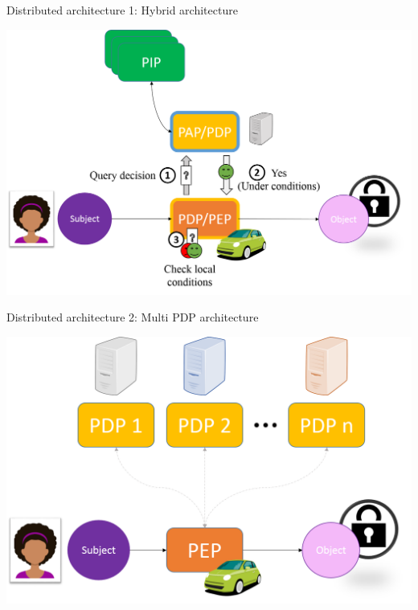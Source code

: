 \begin{frame}{Distributed architecture 1: Hybrid architecture}
    \begin{center}
        \includegraphics[scale=0.35]{Figures/hybrid_archi.png}
    \end{center}    
\end{frame}


\begin{frame}{Distributed architecture 2: Multi PDP architecture}
    \begin{center}
        \includegraphics[scale=0.4]{Figures/multiPDP_archi.png}
    \end{center}    
\end{frame}


